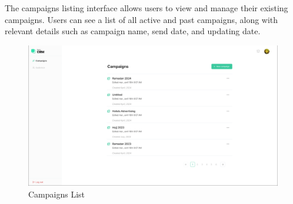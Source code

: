 The campaigns listing interface allows users to view and manage their existing campaigns. Users can see a list of all active and past campaigns, along with relevant details such as campaign name, send date, and updating date.
\begin{figure}[ht]
	\centering
	\includegraphics[width=0.9\linewidth]{Images/Sprint1/screenshots/Screenshot 2024-05-26 214015.png}
	\caption{Campaigns List}
	\label{fig:Campaigns List}
\end{figure}
